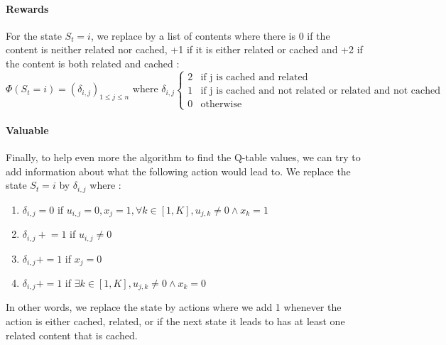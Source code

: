 \documentclass[a4paper]{article}
\begin{document}
\paragraph{Rewards}
For the state $S_t = i$, we replace by a list of contents where there is 0 if the content is neither related nor cached, +1 if it is either related or cached and +2 if the content is both related and cached : 
\[ \Phi(S_t = i ) = (\delta_{i,j})_{1 \le j \le n  } \text{ where } \delta_{i,j} 
\begin{cases}
    2& \text{if j is cached and related}   \\
    1 & \text{if j is cached and not related or related and not cached} \\
    0 & \text{otherwise} 
\end{cases}  \]


\paragraph{Valuable } Finally, to help even more the algorithm to find the Q-table values, we can try to add information about what the following action would lead to. We replace the state $S_t = i$ by $\delta_{i,j}$ where : 
\begin{enumerate}
    \item $\delta_{i,j} = 0$ if $u_{i,j} = 0, x_j = 1, \forall k \in [1,K], u_{j,k} \ne 0 \land x_k = 1   $
    \item $\delta_{i,j} \mathrel{+}= 1$ if $u_{i,j} \ne 0$
    \item $\delta_{i,j} += 1$ if $x_j = 0$
    \item $\delta_{i,j} += 1$ if $\exists k \in [1,K], u_{j,k} \ne 0 \land x_k = 0 $
\end{enumerate}
In other words, we replace the state by actions where we add 1 whenever the action is either cached, related, or if the next state it leads to has at least one related content that is cached.
\end{document}
